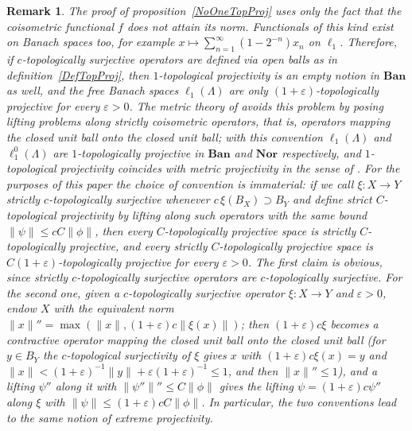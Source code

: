 \documentclass[12pt]{article}
\newtheorem{remark}[theorem]{Remark}
\newcommand{\Nor}{\mathbf{Nor}}
\newcommand{\Ban}{\mathbf{Ban}}
\newcommand{\lo}[1]{\ell_1^0(#1)}
\newcommand{\ellone}[1]{\ell_1(#1)}
\newcommand{\norm}[1]{\lVert #1\rVert}
\begin{document}
\begin{remark}\label{RemarkStrictConvention} The proof of
    proposition~\ref{NoOneTopProj} uses only the fact that the coisometric
    functional $f$ does not attain its norm. Functionals of this kind exist on
    Banach spaces too, for example $x\mapsto\sum_{n=1}^\infty(1-2^{-n})x_n$ on
    $\ell_1$. Therefore, if $c$-topologically surjective operators are defined
    via open balls as in definition~\ref{DefTopProj}, then $1$-topological
    projectivity is an empty notion in $\Ban$ as well, and the free Banach
    spaces $\ellone{\Lambda}$ are only $(1+\varepsilon)$-topologically projective
    for every $\varepsilon>0$. The metric theory of \cite{HelMetrFrQMod} avoids
    this problem by posing lifting problems along strictly coisometric
    operators, that is, operators mapping the closed unit ball onto the closed
    unit ball; with this convention $\ellone{\Lambda}$ and $\lo{\Lambda}$ are
    $1$-topologically projective in $\Ban$ and $\Nor$ respectively, and
    $1$-topological projectivity coincides with metric projectivity in the
    sense of \cite{HelMetrFrQMod}. For the purposes of this paper
    the choice of convention is immaterial: if we call $\xi:X\to Y$ strictly
    $c$-topologically surjective whenever $c\,\xi(B_X)\supset B_Y$ and define
    strict $C$-topological projectivity by lifting along such operators with
    the same bound $\norm{\psi}\leq cC\norm{\phi}$, then every
    $C$-topologically projective space is strictly $C$-topologically projective,
    and every strictly $C$-topologically projective space is
    $C(1+\varepsilon)$-topologically projective for every $\varepsilon>0$. The
    first claim is obvious, since strictly $c$-topologically surjective
    operators are $c$-topologically surjective. For the second one, given a
    $c$-topologically surjective operator $\xi:X\to Y$ and $\varepsilon>0$,
    endow $X$ with the equivalent norm
    $\norm{x}''=\max(\norm{x},(1+\varepsilon)c\norm{\xi(x)})$; then
    $(1+\varepsilon)c\xi$ becomes a contractive operator mapping the closed
    unit ball onto the closed unit ball (for $y\in B_Y$ the $c$-topological
    surjectivity of $\xi$ gives $x$ with $(1+\varepsilon)c\xi(x)=y$ and
    $\norm{x}<(1+\varepsilon)^{-1}\norm{y}+\varepsilon(1+\varepsilon)^{-1}\leq 1$,
    and then $\norm{x}''\leq 1$), and a lifting $\psi''$ along it with
    $\norm{\psi''}''\leq C\norm{\phi}$ gives the lifting
    $\psi=(1+\varepsilon)c\psi''$ along $\xi$ with
    $\norm{\psi}\leq(1+\varepsilon)cC\norm{\phi}$. In particular, the two
    conventions lead to the same notion of extreme projectivity.
\end{remark}
\end{document}

